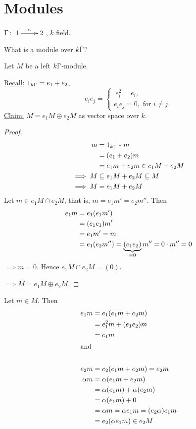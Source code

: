 \section{Modules}
\begin{exam}
$\Gamma\colon \xymatrix{1\ar[r]^\alpha & 2}$, $k$ field. 
	
What is a module over $k\Gamma$? 

Let $M$ be a left $k\Gamma$-module.
	
\underline{Recall:} 
$1_{k\Gamma}=e_1 + e_2$, 
\[e_ie_j=  \begin{cases} \ e_i^2 = e_i,\\
  e_ie_j = 0, \text{\ for $i\neq j$}.
\end{cases}\]
\underline{Claim:} $M = e_1M\oplus e_2M$ as vector space over $k$.
\begin{proof}
  \begin{align}
    m & = 1_{k\Gamma}*m\notag\\
        & =(e_1 + e_2)m\notag\\
        & = e_1m+e_2m \in e_1M + e_2M\notag\\
\implies M & \subseteq e_1M + e_2M \subseteq M\notag\\
 \implies M & = e_1M + e_2M\notag
\end{align}
 Let  $m \in e_1M \cap e_2M$, that is, $m=e_1m'=e_2m''$. Then
\begin{align}
 e_1m & = e_1(e_1m')\notag\\
          & = (e_1e_1)m'\notag\\
          & = e_1m' = m\notag\\
          & = e_1(e_2m'')=\underbrace{(e_1e_2)}_{=0}m''=0\cdot
          m''=0\notag
\end{align}
$\implies m = 0$. Hence $e_1M \cap e_2M = (0)$.

\noindent $\implies M = e_1M \oplus e_2M$. 
\end{proof}

Let \(m\in M\).  Then 
\begin{align}
e_1m & = e_1(e_1m + e_2m)\notag\\
         & = e_1^2m + (e_1e_2)m\notag\\
         & = e_1m\notag\\
\intertext{and}\notag\\
 e_2m & = e_2(e_1m + e_2m) = e_2m\notag\\
\alpha m & = \alpha(e_1m + e_2m)\notag\\
               & = \alpha(e_1m) + \alpha(e_2m)\notag\\
               & = \alpha(e_1m) + 0\notag\\
               & = \alpha m = \alpha e_1 m = (e_2\alpha)e_1m\notag\\
               & = e_2(\alpha e_1 m)\in e_2M\notag
\end{align}


\end{exam}
